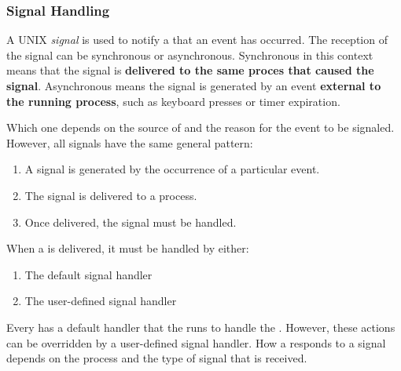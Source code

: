 \subsubsection{Signal Handling}\label{subsubsec:Signal_Handling}
\begin{definition}[Signal]\label{def:Signal}
  A UNIX \emph{signal} is used to notify a  that an event has occurred.
  The reception of the signal can be synchronous or asynchronous.
  Synchronous in this context means that the signal is \textbf{delivered to the same proces that caused the signal}.
  Asynchronous means the signal is generated by an event \textbf{external to the running process}, such as keyboard presses or timer expiration.

  Which one depends on the source of and the reason for the event to be signaled.
  However, all signals have the same general pattern:
  \begin{enumerate}[noitemsep]
  \item A signal is generated by the occurrence of a particular event.
  \item The signal is delivered to a process.
  \item Once delivered, the signal must be handled.
  \end{enumerate}
\end{definition}

When a  is delivered, it must be handled by either:
\begin{enumerate}[noitemsep]
\item The default signal handler
\item The user-defined signal handler
\end{enumerate}

Every  has a default handler that the  runs to handle the .
However, these actions can be overridden by a user-defined signal handler.
How a  responds to a signal depends on the process and the type of signal that is received.


